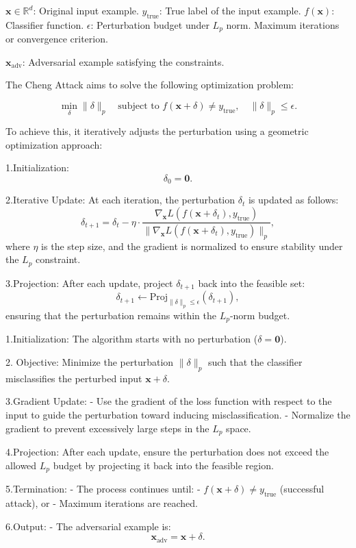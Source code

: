 
$\mathbf{x} \in \mathbb{R}^d$: Original input example.
$y_{\text{true}}$: True label of the input example.
$f(\mathbf{x})$: Classifier function.
$\epsilon$: Perturbation budget under $L_p$ norm.
Maximum iterations or convergence criterion.

$\mathbf{x}_{\text{adv}}$: Adversarial example satisfying the constraints.

The Cheng Attack aims to solve the following optimization problem:

\[
\min_{\delta} \|\delta\|_p \quad \text{subject to } f(\mathbf{x} + \delta) \neq y_{\text{true}}, \quad \|\delta\|_p \leq \epsilon.
\]

To achieve this, it iteratively adjusts the perturbation using a geometric optimization approach:

1.Initialization:
   \[
   \delta_0 = \mathbf{0}.
   \]

2.Iterative Update:
   At each iteration, the perturbation $\delta_t$ is updated as follows:
   \[
   \delta_{t+1} = \delta_t - \eta \cdot \frac{\nabla_{\mathbf{x}} L(f(\mathbf{x} + \delta_t), y_{\text{true}})}{\|\nabla_{\mathbf{x}} L(f(\mathbf{x} + \delta_t), y_{\text{true}})\|_p},
   \]
   where $\eta$ is the step size, and the gradient is normalized to ensure stability under the $L_p$ constraint.

3.Projection:
   After each update, project $\delta_{t+1}$ back into the feasible set:
   \[
   \delta_{t+1} \gets \text{Proj}_{\|\delta\|_p \leq \epsilon} (\delta_{t+1}),
   \]
   ensuring that the perturbation remains within the $L_p$-norm budget.

1.Initialization: The algorithm starts with no perturbation ($\delta = \mathbf{0}$).

2. Objective: Minimize the perturbation $\|\delta\|_p$ such that the classifier misclassifies the perturbed input $\mathbf{x} + \delta$.

3.Gradient Update:
   - Use the gradient of the loss function with respect to the input to guide the perturbation toward inducing misclassification. 
   - Normalize the gradient to prevent excessively large steps in the $L_p$ space.

4.Projection: After each update, ensure the perturbation does not exceed the allowed $L_p$ budget by projecting it back into the feasible region.

5.Termination:
   - The process continues until:
     - $f(\mathbf{x} + \delta) \neq y_{\text{true}}$ (successful attack), or
     - Maximum iterations are reached.

6.Output:
   - The adversarial example is:
     \[
     \mathbf{x}_{\text{adv}} = \mathbf{x} + \delta.
     \]